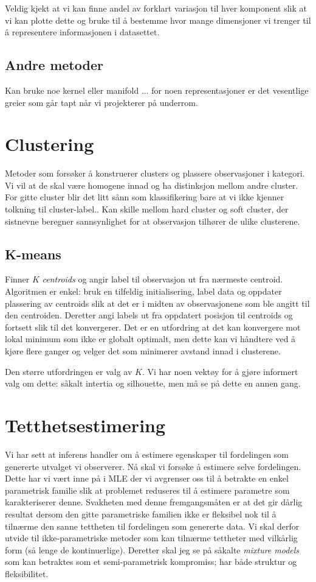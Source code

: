 Veldig kjekt at vi kan finne andel av forklart variasjon til hver komponent slik at vi kan plotte dette og bruke til å bestemme hvor mange dimensjoner vi trenger til å representere informasjonen i datasettet. 
\subsection{Andre metoder}
Kan bruke noe kernel eller manifold ... for noen representasjoner er det vesentlige greier som går tapt når vi projekterer på underrom.
\section{Clustering}
Metoder som forsøker å konstruerer clusters og plassere observasjoner i kategori. Vi vil at de skal være homogene innad og ha distinksjon mellom andre cluster. For gitte cluster blir det litt sånn som klassifikering bare at vi ikke kjenner tolkning til cluster-label.. Kan skille mellom hard cluster og soft cluster, der sistnevne beregner sannsynlighet for at observasjon tilhører de ulike clusterene. 
\subsection{K-means}
Finner $K$ \textit{centroids} og angir label til observasjon ut fra nærmeste centroid. Algoritmen er enkel: bruk en tilfeldig initialisering, label data og oppdater plassering av centroids slik at det er i midten av observasjonene som ble angitt til den centroiden. Deretter angi labels ut fra oppdatert posisjon til centroids og fortsett slik til det konvergerer. Det er en utfordring at det kan konvergere mot lokal minimum som ikke er globalt optimalt, men dette kan vi håndtere ved å kjøre flere ganger og velger det som minimerer avstand innad i clusterene. 

Den større utfordringen er valg av $K$. Vi har noen vektøy for å gjøre informert valg om dette: såkalt intertia og silhouette, men må se på dette en annen gang.
\section{Tetthetsestimering}
Vi har sett at inferens handler om å estimere egenskaper til fordelingen som genererte utvalget vi observerer. Nå skal vi forsøke å estimere selve fordelingen. Dette har vi vært inne på i MLE der vi avgrenser oss til å betrakte en enkel parametrisk familie slik at problemet reduseres til å estimere parametre som karakteriserer denne. Svakheten med denne fremgangsmåten er at det gir dårlig resultat dersom den gitte parametriske familien ikke er fleksibel nok til å tilnærme den sanne tettheten til fordelingen som genererte data. Vi skal derfor utvide til ikke-parametriske metoder som kan tilnærme tettheter med vilkårlig form (så lenge de kontinuerlige). Deretter skal jeg se på såkalte \textit{mixture models} som kan betraktes som et semi-parametrisk kompromiss; har både struktur og fleksibilitet.

